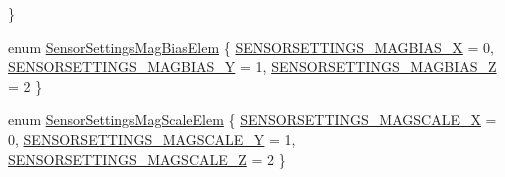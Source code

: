 \begin{DoxyCompactItemize}
 \}
\item 
enum \hyperlink{group___sensor_settings_ga9f56a07838a72562c38cf16da4c832f4}{\-Sensor\-Settings\-Mag\-Bias\-Elem} \{ \hyperlink{group___sensor_settings_gga9f56a07838a72562c38cf16da4c832f4a4bb1d1e18fafd5d987339efb8834956a}{\-S\-E\-N\-S\-O\-R\-S\-E\-T\-T\-I\-N\-G\-S\-\_\-\-M\-A\-G\-B\-I\-A\-S\-\_\-\-X} = 0, 
\hyperlink{group___sensor_settings_gga9f56a07838a72562c38cf16da4c832f4ad7d3da5422b8f8fc4988980c6f731b7e}{\-S\-E\-N\-S\-O\-R\-S\-E\-T\-T\-I\-N\-G\-S\-\_\-\-M\-A\-G\-B\-I\-A\-S\-\_\-\-Y} = 1, 
\hyperlink{group___sensor_settings_gga9f56a07838a72562c38cf16da4c832f4ae9d5f02941b13d04643f865f1fa2ac76}{\-S\-E\-N\-S\-O\-R\-S\-E\-T\-T\-I\-N\-G\-S\-\_\-\-M\-A\-G\-B\-I\-A\-S\-\_\-\-Z} = 2
 \}
\item 
enum \hyperlink{group___sensor_settings_ga3892bd02d17f8df5bdb59bda4a4c736a}{\-Sensor\-Settings\-Mag\-Scale\-Elem} \{ \hyperlink{group___sensor_settings_gga3892bd02d17f8df5bdb59bda4a4c736aa42927da095406d13e42df9982eb61ced}{\-S\-E\-N\-S\-O\-R\-S\-E\-T\-T\-I\-N\-G\-S\-\_\-\-M\-A\-G\-S\-C\-A\-L\-E\-\_\-\-X} = 0, 
\hyperlink{group___sensor_settings_gga3892bd02d17f8df5bdb59bda4a4c736aa99675f666bfdcae6fca54a27d77ed04b}{\-S\-E\-N\-S\-O\-R\-S\-E\-T\-T\-I\-N\-G\-S\-\_\-\-M\-A\-G\-S\-C\-A\-L\-E\-\_\-\-Y} = 1, 
\hyperlink{group___sensor_settings_gga3892bd02d17f8df5bdb59bda4a4c736aadc8c167e649129ebdc97a68a7224fba8}{\-S\-E\-N\-S\-O\-R\-S\-E\-T\-T\-I\-N\-G\-S\-\_\-\-M\-A\-G\-S\-C\-A\-L\-E\-\_\-\-Z} = 2
 \}
\end{DoxyCompactItemize}
